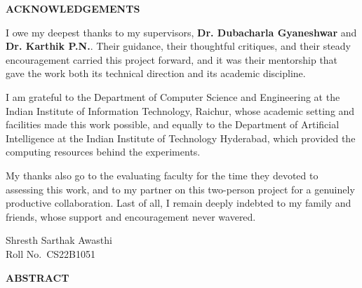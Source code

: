\documentclass[12pt, a4paper, oneside]{report}
\newcommand{\studentName}{Shresth Sarthak Awasthi}
\newcommand{\rollNumber}{CS22B1051}
\newcommand{\supervisorName}{Dr. Dubacharla Gyaneshwar}
\newcommand{\supervisorNameB}{Dr. Karthik P.N.}
\newcommand{\departmentName}{Computer Science and Engineering}
\newcommand{\frontmatterheading}[1]{%
  \begin{center}\Large\bfseries #1\end{center}
  \vspace{0.5cm}
}
\begin{document}
\clearpage
\thispagestyle{plain}
\frontmatterheading{ACKNOWLEDGEMENTS}

\noindent I owe my deepest thanks to my supervisors,
\textbf{\supervisorName} and \textbf{\supervisorNameB}. Their guidance, their
thoughtful critiques, and their steady encouragement carried this project
forward, and it was their mentorship that gave the work both its technical
direction and its academic discipline.

\noindent I am grateful to the Department of \departmentName{} at the Indian
Institute of Information Technology, Raichur, whose academic setting and
facilities made this work possible, and equally to the Department of Artificial
Intelligence at the Indian Institute of Technology Hyderabad, which provided
the computing resources behind the experiments.

\noindent My thanks also go to the evaluating faculty for the time they devoted
to assessing this work, and to my partner on this two-person project for a
genuinely productive collaboration. Last of all, I remain deeply indebted to my
family and friends, whose support and encouragement never wavered.

\vspace{2cm}
\noindent
\begin{flushright}
\studentName \\
Roll No.~\rollNumber
\end{flushright}

\clearpage
\thispagestyle{plain}
\frontmatterheading{ABSTRACT}
\end{document}
